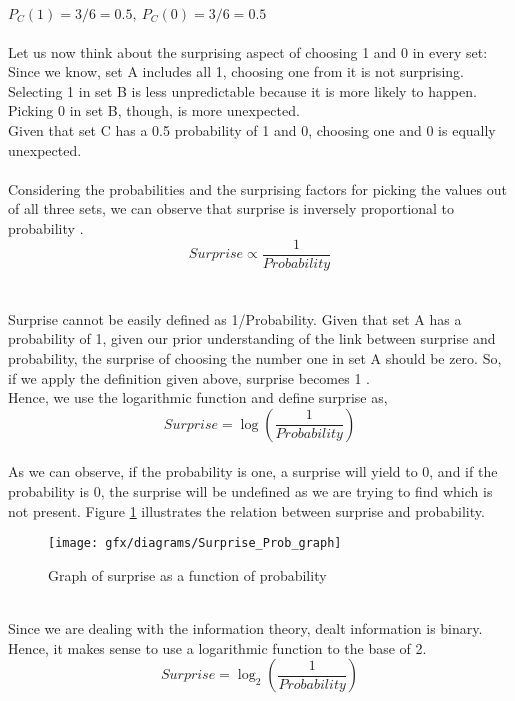 $P_{C}(1) = 3/6 = 0.5,\ P_{C}(0) = 3/6 = 0.5$\\\\
Let us now think about the surprising aspect of choosing 1 and 0 in
every set:\\
Since we know, set A includes all 1, choosing one from it is not surprising.\\
Selecting 1 in set B is less unpredictable because it is more likely to happen. Picking 0 in set B, though, is more unexpected.\\
Given that set C has a 0.5 probability of 1 and 0, choosing one and 0 is equally unexpected.\\\\
Considering the probabilities and the surprising factors for picking the values out of all three sets, we can observe that surprise is inversely proportional to probability \cite{YT-2021}.
\begin{equation*}
Surprise \propto \frac{1}{Probability}
\end{equation*}\\\\
Surprise cannot be easily defined as 1/Probability. Given that set A has a probability of 1, given our prior understanding of the link between surprise and probability, the surprise of choosing the number one in set A should be zero. So, if we apply the definition given above, surprise becomes 1  \cite{YT-2021}.\\
Hence, we use the logarithmic function and define surprise as,
\begin{equation*}
Surprise = \log\left(\frac{1}{Probability}\right)
\end{equation*}\\
As we can observe, if the probability is one, a surprise will yield
to $0$, and if the probability is $0$, the surprise will be undefined as we are trying to find which is not present. Figure \ref{fig:2:1} illustrates the relation between surprise and probability.
\begin{figure}[htbp]
	\centering
	\texttt{[image: gfx/diagrams/Surprise\_Prob\_graph]}
	\caption{Graph of surprise as a function of probability}
	\label{fig:2:1}
\end{figure}\\
Since we are dealing with the information theory, dealt information is binary. Hence, it makes sense to use a logarithmic function to
the base of 2.
\begin{equation}\label{eq:2:3}
Surprise = \log_{2}\left(\frac{1}{Probability}\right)
\end{equation}\\
